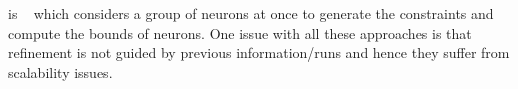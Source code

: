 \deeppoly{} %
is \kpoly{}~\cite{singh2019beyond} which considers 
a group of neurons at once to generate the constraints and compute the bounds of neurons. One issue with all these approaches is that refinement is not guided by previous information/runs and hence they suffer from scalability issues.




